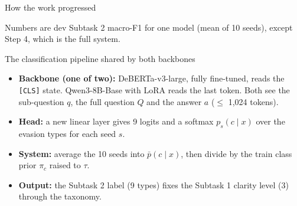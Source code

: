 \documentclass[aspectratio=169,10pt]{beamer}
\newcommand{\hl}[1]{\textcolor{accent}{\textbf{#1}}}
\begin{document}
\begin{frame}{How the work progressed}
  \vspace{2pt}

  {\footnotesize Numbers are dev Subtask 2 macro-F1 for one model (mean of 10 seeds), except Step 4, which is the full system.}
\end{frame}

\begin{frame}{The classification pipeline shared by both backbones}
  \centering
  \resizebox{\textwidth}{!}{}
  \vspace{6pt}
  \begin{itemize}\small
    \item \textbf{Backbone (one of two):} DeBERTa-v3-large, fully fine-tuned, reads the \texttt{[CLS]} state. Qwen3-8B-Base with LoRA reads the last token. Both see the sub-question $q$, the full question $Q$ and the answer $a$ ($\le$ 1,024 tokens).
    \item \textbf{Head:} a new linear layer gives 9 logits and a softmax $p_s(c\mid x)$ over the evasion types for each seed $s$.
    \item \textbf{System:} average the 10 seeds into $\bar p(c\mid x)$, then divide by the train class prior $\pi_c$ raised to $\tau$.
    \item \textbf{Output:} the Subtask 2 label (9 types) fixes the Subtask 1 clarity level (3) through the taxonomy.
  \end{itemize}
\end{frame}
\end{document}
